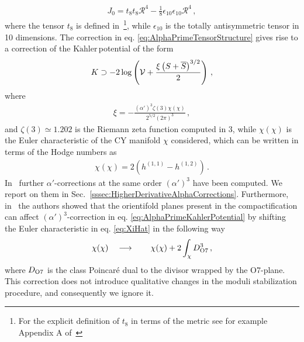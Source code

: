 \documentclass[12pt,a4paper]{book}
\newcommand{\Kahler}{\ensuremath{\text{K}\ddot{\text{a}}\text{hler}\,}}
\newcommand{\be}{\begin{equation}}
\newcommand{\ee}{\end{equation}}
\newcommand{\V}{{\cal{V}}}
\begin{document}
\begin{align}
\label{eq:AlphaPrimeTensorStructure}
J_0 = t_8 t_8 \mathcal{R}^4 - \frac{1}{8} \epsilon_{10} \epsilon_{10} \mathcal{R}^4 \,,
\end{align}
where the tensor $t_8$ is defined in~\cite{Green:1987sp, Tseytlin:1995bi, Minasian:2015bxa}\footnote{For the explicit definition of $t_8$ in terms of the metric see for example Appendix A of~\cite{Minasian:2015bxa}}, while $\epsilon_{10}$ is the totally antisymmetric tensor in 10 dimensions. The correction in eq. \eqref{eq:AlphaPrimeTensorStructure} gives rise to a correction of the \Kahler potential of the form~\cite{Becker:2002nn}
\be
\label{eq:AlphaPrimeKahlerPotential}
K \supset - 2 \log \left(\V + \frac{\xi \left(S + \overline{S}\right)^{3/2}}{2}\right) \,,
\ee
where
\begin{align}
\label{eq:XiHat}
\xi = - \frac{\left(\alpha'\right)^3 \zeta(3) \chi(\chi)}{2^{5/2} (2 \pi)^3} \,,
\end{align}
and $\zeta(3) \simeq 1.202$ is the Riemann zeta function computed in $3$, while $\chi(\chi)$ is the Euler characteristic of the CY manifold $\chi$ considered, which can be written in terms of the Hodge numbers as
\begin{align}
\label{eq:EulerCY}
\chi(\chi) = 2 \left(h^{(1,1)} - h^{(1,2)}\right) \,.
\end{align}
In~\cite{Ciupke:2015msa} further $\alpha'$-corrections at the same order $\left(\alpha'\right)^3$ have been computed. We report on them in Sec.~\ref{sssec:HigherDerivativeAlphaCorrections}. Furthermore, in~\cite{Minasian:2015bxa} the authors showed that the orientifold planes present in the compactification can affect $(\alpha')^3$-correction in eq. \eqref{eq:AlphaPrimeKahlerPotential} by shifting the Euler characteristic in eq. \eqref{eq:XiHat} in the following way
\begin{align}
\chi(\chi) \quad \longrightarrow \qquad \chi(\chi) + 2 \int_{\chi} D_{\rm O7}^3 \,,
\end{align}
where $D_{\rm O7}$ is the class Poincar\'e dual to the divisor wrapped by the O7-plane. This correction does not introduce qualitative changes in the moduli stabilization procedure, and consequently we ignore it.
\end{document}
